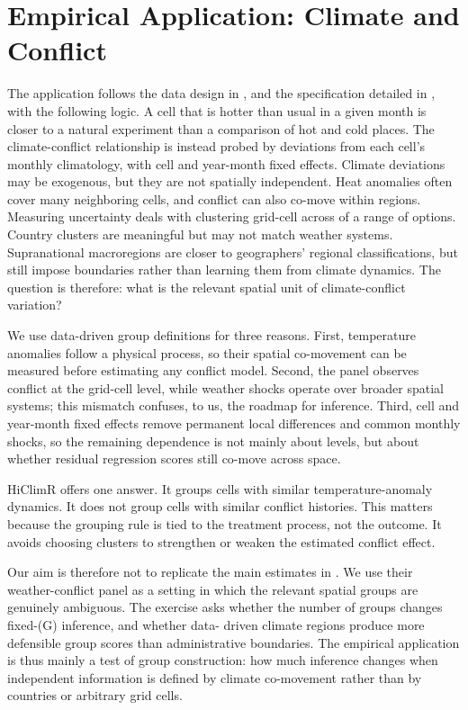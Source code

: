 \documentclass[
]{article}
\begin{document}
\section{Empirical Application: Climate and Conflict}

The application follows the data design in \citet{burke2024}, and the
specification detailed in \citet{hsiang_burke_miguel_2013}, with the
following logic. A cell that is hotter than usual in a given month is
closer to a natural experiment than a comparison of hot and cold places.
The climate-conflict relationship is instead probed by deviations from
each cell's monthly climatology, with cell and year-month fixed effects.
Climate deviations may be exogenous, but they are not spatially
independent. Heat anomalies often cover many neighboring cells, and
conflict can also co-move within regions. Measuring uncertainty deals
with clustering grid-cell across of a range of options. Country clusters
are meaningful but may not match weather systems. Supranational
macroregions are closer to geographers' regional classifications, but
still impose boundaries rather than learning them from climate dynamics.
The question is therefore: what is the relevant spatial unit of
climate-conflict variation?

We use data-driven group definitions for three reasons. First,
temperature anomalies follow a physical process, so their spatial
co-movement can be measured before estimating any conflict model.
Second, the panel observes conflict at the grid-cell level, while
weather shocks operate over broader spatial systems; this mismatch
confuses, to us, the roadmap for inference. Third, cell and year-month
fixed effects remove permanent local differences and common monthly
shocks, so the remaining dependence is not mainly about levels, but
about whether residual regression scores still co-move across space.

HiClimR offers one answer. It groups cells with similar
temperature-anomaly dynamics. It does not group cells with similar
conflict histories. This matters because the grouping rule is tied to
the treatment process, not the outcome. It avoids choosing clusters to
strengthen or weaken the estimated conflict effect.

Our aim is therefore not to replicate the main estimates in
\citet{burke2024}. We use their weather-conflict panel as a setting in
which the relevant spatial groups are genuinely ambiguous. The exercise
asks whether the number of groups changes fixed-(G) inference, and
whether data- driven climate regions produce more defensible group
scores than administrative boundaries. The empirical application is thus
mainly a test of group construction: how much inference changes when
independent information is defined by climate co-movement rather than by
countries or arbitrary grid cells.
\end{document}
